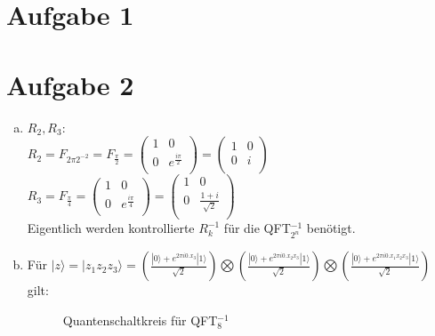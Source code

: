 \documentclass[a4paper]{scrartcl}
\begin{document}
\section*{Aufgabe 1}

\newpage
\section*{Aufgabe 2}
\begin{enumerate}[a)]
\item
$R_2, R_3:$\\
$R_2=F_{2\pi 2^{-2}}=F_{\frac{\pi}{2}} = 
\begin{pmatrix}
1 & 0 \\ 0 & e^{\frac{i \pi}{2}} \\
\end{pmatrix} = \begin{pmatrix}
1 & 0 \\ 0 & i\\
\end{pmatrix}$\\
$R_3=F_{\frac{\pi}{4}} = 
\begin{pmatrix}
1 & 0 \\ 0 & e^{\frac{i \pi}{4}} \\
\end{pmatrix} = \begin{pmatrix}
1 & 0 \\ 0 & \frac{1+i}{\sqrt{2}}\\
\end{pmatrix}$ \\
Eigentlich werden kontrollierte $R_k^{-1}$ für die QFT$_{2^n}^{-1}$ benötigt.

\item Für $|z\rangle = |z_1 z_2 z_3\rangle= (\frac{|0\rangle+e^{2\pi i0.x_3} |1\rangle }{\sqrt{2}})\bigotimes(\frac{|0\rangle+e^{2\pi i0.x_2x_3} |1\rangle }{\sqrt{2}})\bigotimes(\frac{|0\rangle+e^{2\pi i0.x_1x_2x_3} |1\rangle }{\sqrt{2}})$ gilt:

\begin{figure}[htp] 
\caption{Quantenschaltkreis für QFT$_{8}^{-1}$}
\end{figure}


\end{enumerate}
\end{document}
